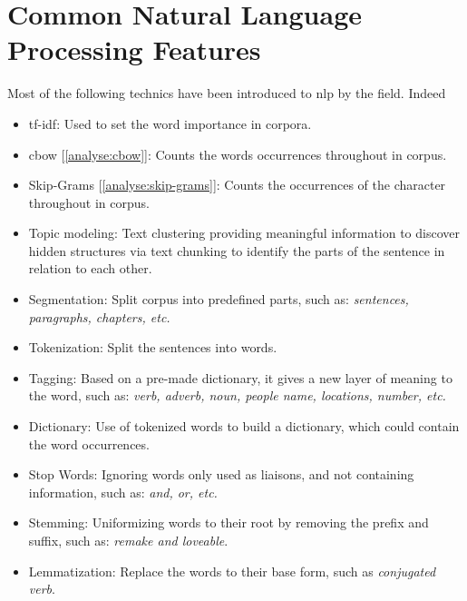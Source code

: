 \section{Common Natural Language Processing Features}
Most of the following technics have been introduced to \gls{nlp} by the  field. Indeed

\begin{itemize}
    \setlength\itemsep{0em}
    \item \gls{tf-idf}: Used to set the word importance in corpora.
    \item \gls{cbow} [\ref{analyse:cbow}]: Counts the words occurrences throughout in corpus.
    \item Skip-Grams [\ref{analyse:skip-grams}]: Counts the occurrences of the character throughout in corpus.
    \item Topic modeling: Text clustering providing meaningful information to discover hidden structures via text chunking to identify the parts of the sentence in relation to each other.
    \item Segmentation: Split corpus into predefined parts, such as: \textit{sentences, paragraphs, chapters, etc.}
    \item Tokenization: Split the sentences into words.
    \item Tagging: Based on a pre-made dictionary, it gives a new layer of meaning to the word, such as: \textit{verb, adverb, noun, people name, locations, number, etc.}
    \item Dictionary: Use of tokenized words to build a dictionary, which could contain the word occurrences.
    \item Stop Words: Ignoring words only used as liaisons, and not containing information, such as: \textit{and, or, etc.}
    \item Stemming: Uniformizing words to their root by removing the prefix and suffix, such as: \textit{remake and loveable}.
    \item Lemmatization: Replace the words to their base form, such as \textit{conjugated verb}.
\end{itemize}
